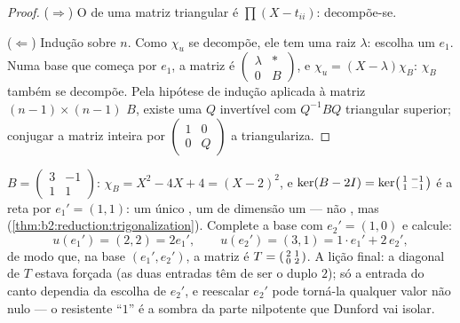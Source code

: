 \begin{proof}
($\Rightarrow$) O  de uma matriz triangular
é $\prod(X - t_{ii})$: decompõe-se.

($\Leftarrow$) Indução sobre $n$. Como $\chi_u$ se decompõe, ele tem uma
raiz $\lambda$: escolha um  $e_1$. Numa base que começa por
$e_1$, a matriz é $\begin{pmatrix} \lambda & \ast\\ 0 &
B\end{pmatrix}$, e $\chi_u = (X - \lambda)\chi_B$: $\chi_B$ também
se decompõe. Pela hipótese de indução aplicada à matriz $(n-1) \times
(n-1)$ $B$, existe uma $Q$ invertível com $Q^{-1}BQ$ triangular
superior; conjugar a matriz inteira por $\begin{pmatrix}1 & 0\\
0 & Q\end{pmatrix}$ a triangulariza.
\end{proof}

\begin{example}\label{ex:b2:reduction:trigwork}
$B = \begin{pmatrix}3 & -1\\ 1 & 1\end{pmatrix}$: $\chi_B = X^2 -
4X + 4 = (X - 2)^2$, e $\ker(B - 2I) =
\ker\begin{psmallmatrix}1 & -1\\ 1 & -1\end{psmallmatrix}$ é
a reta  por $e_1' = (1, 1)$: um único , um
 de dimensão um --- não , mas
 (\cref{thm:b2:reduction:trigonalization}).
Complete a base com $e_2' = (1, 0)$ e calcule:
\[
u(e_1') = (2, 2) = 2e_1',
\qquad
u(e_2') = (3, 1) = 1\cdot e_1' + 2\, e_2' ,
\]
de modo que, na base $(e_1', e_2')$, a matriz é $T =
\begin{psmallmatrix}2 & 1\\ 0 & 2\end{psmallmatrix}$. A
lição final: a diagonal de $T$ estava forçada (as duas entradas
têm de ser o  duplo $2$); só a entrada do canto
dependia da escolha de $e_2'$, e reescalar $e_2'$ pode torná-la
qualquer valor não nulo --- o resistente ``$1$'' é a sombra da
parte nilpotente que Dunford vai isolar.
\end{example}

